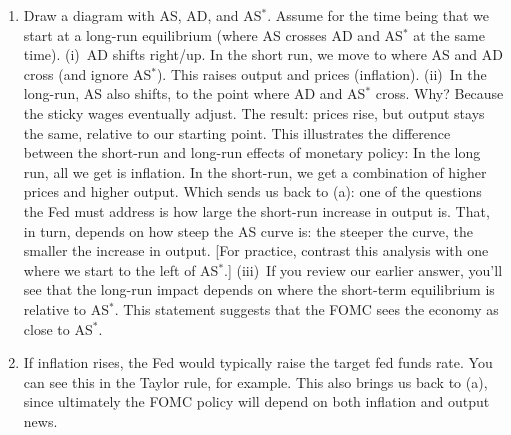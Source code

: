 \documentclass[letterpaper,12pt]{article}
\begin{document}
\begin{enumerate}
\begin{enumerate}
\item Draw a diagram with AS, AD, and AS$^*$.
Assume for the time being that we start at a long-run equilibrium
(where AS crosses AD and AS$^*$ at the same time). (i)~AD shifts
right/up. In the short run, we move to where AS and AD cross (and
ignore AS$^*$). This raises output and prices (inflation). (ii)~In
the long-run, AS also shifts, to the point where AD and AS$^*$
cross. Why? Because the sticky wages eventually adjust. The result:
prices rise, but output stays the same, relative to our starting
point. This illustrates the difference between the short-run and
long-run effects of monetary policy:  In the long run, all we get is
inflation.  In the short-run, we get a combination of higher prices
and higher output. Which sends us back to (a):  one of the questions
the Fed must address is how large the short-run increase in output
is.  That, in turn, depends on how steep the AS curve is:  the
steeper the curve, the smaller the increase in output. [For
practice, contrast this analysis with one where we start to the left
of AS$^*$.]
%
(iii)~If you review our earlier answer, you'll see that the long-run
impact depends on where the short-term equilibrium is relative to
AS$^*$. This statement suggests that the FOMC sees the economy as
close to AS$^*$.


\item If inflation rises, the Fed would typically raise
the target fed funds rate. You can see this in the Taylor rule, for
example. This also brings us back to (a), since ultimately the FOMC
policy will depend on both inflation and output news.

\end{enumerate}



\end{enumerate}
\end{document}
